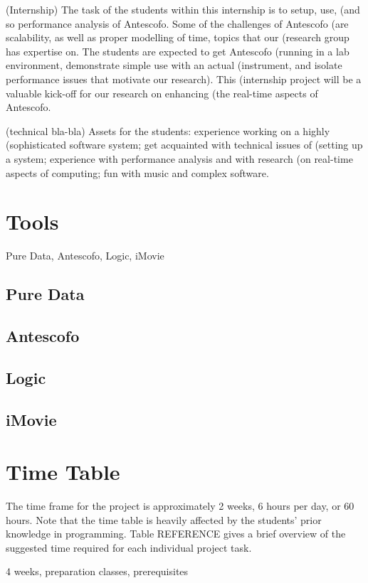\documentclass[onecolumn,nocopyrightspace,preprint]{sigplanconf}
\begin{document}
(Internship) The task of the students within this internship is to setup, use,
(and so performance analysis of Antescofo. Some of the challenges of Antescofo
(are scalability, as well as proper modelling of time, topics that our
(research group has expertise on. The students are expected to get Antescofo
(running in a lab environment, demonstrate simple use with an actual
(instrument, and isolate performance issues that motivate our research). This
(internship project will be a valuable kick-off for our research on enhancing
(the real-time aspects of Antescofo.

(technical bla-bla) Assets for the students: experience working on a highly
(sophisticated software system; get acquainted with technical issues of
(setting up a system; experience with performance analysis and with research
(on real-time aspects of computing; fun with music and complex software.

\section{Tools}
Pure Data, Antescofo, Logic, iMovie

\subsection{Pure Data}

\subsection{Antescofo}

\subsection{Logic}

\subsection{iMovie}


\section{Time Table}

The time frame for the project is approximately 2 weeks, 6 hours per day, or 60 hours.
Note that the time table is heavily affected by the students' prior knowledge in
programming. Table REFERENCE gives a brief overview of the suggested time required for each individual project task.






4 weeks, preparation classes, prerequisites
\end{document}
